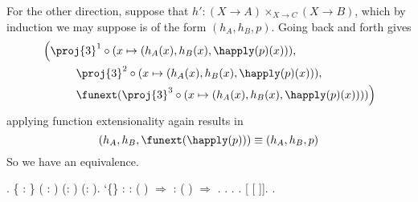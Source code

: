 For the other direction, suppose that $h' : (X \to A) \times_{X \to C} (X \to
B)$, which by induction we may suppose is of the form $(h_{A}, h_{B}, p)$.
Going back and forth gives
\begin{align*}
  &\left(
    \proj{3}^{1} \circ (x \mapsto (h_{A}(x), h_{B}(x), \happly(p)(x))),
    \right.\\&\phantom{---}\left.
    \proj{3}^{2} \circ (x \mapsto (h_{A}(x), h_{B}(x), \happly(p)(x))),
    \right.\\&\phantom{---}\left.
    \funext(\proj{3}^{3} \circ (x \mapsto (h_{A}(x), h_{B}(x), \happly(p)(x))))
  \right)
\end{align*}
applying function extensionality again results in
\[
  (h_{A}, h_{B}, \funext(\happly(p)))
  \equiv
  (h_{A}, h_{B}, p)
\]
So we have an equivalence.
\begin{coqdoccode}
\coqdocemptyline
\coqdocnoindent
{} .\coqdoceol
\coqdocemptyline
\coqdocnoindent
{} \{   : \} ( : ) (:   ) (:   ).\coqdoceol
\coqdocemptyline
\coqdocnoindent
{}\coqdocindent{0.50em}
  `\{\} \coqdoceol
\coqdocindent{1.00em}
:   \coqdocnotation{(}  : (  ) \ensuremath{\Rightarrow} \coqdocnotation{)} \coqdocnotation{=}   \coqdocnotation{(}  : (  ) \ensuremath{\Rightarrow} \coqdocnotation{)}.\coqdoceol
\coqdocnoindent
{}.\coqdoceol
\coqdocindent{1.00em}
 .  .    [ [ ]].  .\coqdoceol
\coqdocnoindent

\end{coqdoccode}
